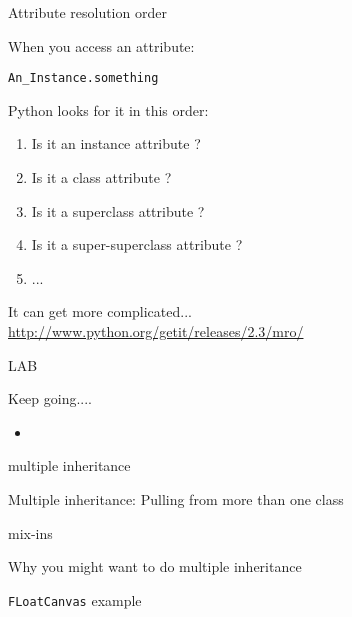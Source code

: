 \documentclass{beamer}
\begin{document}
\begin{frame}[fragile]{Attribute resolution order}

{\Large When you access an attribute:

\verb|An_Instance.something|}

\vfill
{\Large Python looks for it in this order:}

\vfill
\begin{enumerate}
  \item Is it an instance attribute ?
  \item Is it a class attribute ?
  \item Is it a superclass attribute ?
  \item Is it a super-superclass attribute ?
  \item ...
\end{enumerate}

\vfill
It can get more complicated...\\
\url{http://www.python.org/getit/releases/2.3/mro/}
\end{frame} 

\begin{frame}{LAB}

{Keep going....}

\begin{itemize}
  \item
\end{itemize}

\end{frame}

\begin{frame}[fragile]{multiple inheritance}

{\Large Multiple inheritance: Pulling from more than one class}
\end{frame} 

\begin{frame}[fragile]{mix-ins}

\vfill
{\Large Why you might want to do multiple inheritance}

\vfill
{\Large \verb|FLoatCanvas| example}

\vfill
\end{frame} 



%
%
%
\end{document}
